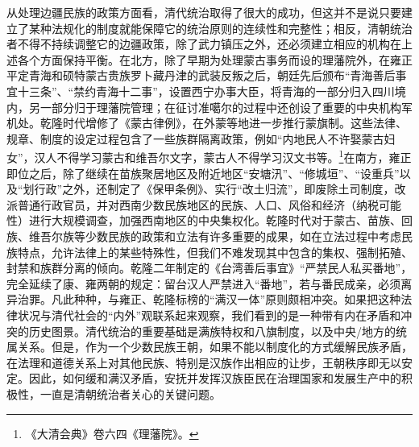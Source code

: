 \documentclass[a4paper, 12pt, openright]{ctexbook}
\begin{document}
从处理边疆民族的政策方面看，清代统治取得了很大的成功，但这并不是说只要建立了某种法规化的制度就能保障它的统治原则的连续性和完整性；相反，清朝统治者不得不持续调整它的边疆政策，除了武力镇压之外，还必须建立相应的机构在上述各个方面保持平衡。在北方，除了早期为处理蒙古事务而设的理藩院外，在雍正平定青海和硕特蒙古贵族罗卜藏丹津的武装反叛之后，朝廷先后颁布“青海善后事宜十三条”、“禁约青海十二事”，设置西宁办事大臣，将青海的一部分归入四川境内，另一部分归于理藩院管理；在征讨准噶尔的过程中还创设了重要的中央机构军机处。乾隆时代增修了《蒙古律例》，在外蒙等地进一步推行蒙旗制。这些法律、规章、制度的设定过程包含了一些族群隔离政策，例如“内地民人不许娶蒙古妇女”，汉人不得学习蒙古和维吾尔文字，蒙古人不得学习汉文书等。\footnote{《大清会典》卷六四《理藩院》。}在南方，雍正即位之后，除了继续在苗族聚居地区及附近地区“安塘汛”、“修城垣”、“设重兵”以及“划行政”之外，还制定了《保甲条例》、实行“改土归流”，即废除土司制度，改派普通行政官员，并对西南少数民族地区的民族、人口、风俗和经济（纳税可能性）进行大规模调查，加强西南地区的中央集权化。乾隆时代对于蒙古、苗族、回族、维吾尔族等少数民族的政策和立法有许多重要的成果，如在立法过程中考虑民族特点，允许法律上的某些特殊性，但我们不难发现其中包含的集权、强制拓殖、封禁和族群分离的倾向。乾隆二年制定的《台湾善后事宜》“严禁民人私买番地”，完全延续了康、雍两朝的规定：留台汉人严禁进入“番地”，若与番民成亲，必须离异治罪。凡此种种，与雍正、乾隆标榜的“满汉一体”原则颇相冲突。如果把这种法律状况与清代社会的“内外”观联系起来观察，我们看到的是一种带有内在矛盾和冲突的历史图景。清代统治的重要基础是满族特权和八旗制度，以及中央/地方的统属关系。但是，作为一个少数民族王朝，如果不能以制度化的方式缓解民族矛盾，在法理和道德关系上对其他民族、特别是汉族作出相应的让步，王朝秩序即无以安定。因此，如何缓和满汉矛盾，安抚并发挥汉族臣民在治理国家和发展生产中的积极性，一直是清朝统治者关心的关键问题。
\end{document}
